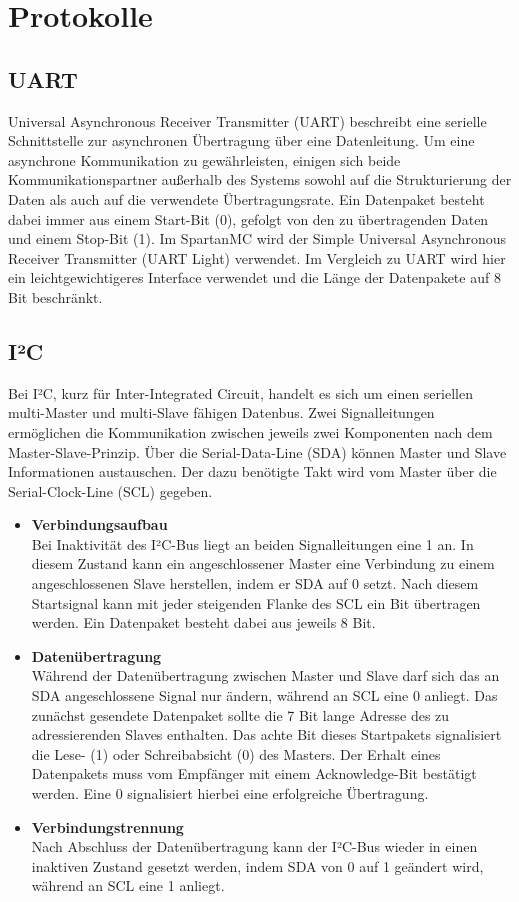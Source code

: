 \documentclass[parskip,
							 oneside,
							 11pt,
							 noheadingspace,
							 accentcolor=tud1d,
							 bigchapter,
							 colorback]{tudreport}
\begin{document}
\chapter{Protokolle}
\section{UART}
Universal Asynchronous Receiver Transmitter (UART) beschreibt eine serielle Schnittstelle zur asynchronen Übertragung über eine Datenleitung. Um eine asynchrone Kommunikation zu gewährleisten, einigen sich beide Kommunikationspartner außerhalb des Systems sowohl auf die Strukturierung der Daten als auch auf die verwendete Übertragungsrate. Ein Datenpaket besteht dabei immer aus einem Start-Bit (0), gefolgt von den zu übertragenden Daten und einem Stop-Bit (1). Im SpartanMC wird der Simple Universal Asynchronous Receiver Transmitter (UART Light) verwendet. Im Vergleich zu UART wird hier ein leichtgewichtigeres Interface verwendet und die Länge der Datenpakete auf 8 Bit beschränkt.
\section{I²C}
Bei I²C, kurz für Inter-Integrated Circuit, handelt es sich um einen seriellen multi-Master und multi-Slave fähigen Datenbus. Zwei Signalleitungen ermöglichen die Kommunikation zwischen jeweils zwei Komponenten nach dem Master-Slave-Prinzip. Über die Serial-Data-Line (SDA) können Master und Slave Informationen austauschen. Der dazu benötigte Takt wird vom Master über die Serial-Clock-Line (SCL) gegeben.

\begin{itemize}
 \item{\textbf{Verbindungsaufbau}} \\
 Bei Inaktivität des I²C-Bus liegt an beiden Signalleitungen eine 1 an. In diesem Zustand kann ein angeschlossener Master eine Verbindung zu einem angeschlossenen Slave herstellen, indem er SDA auf 0 setzt. Nach diesem Startsignal kann mit jeder steigenden Flanke des SCL ein Bit übertragen werden. Ein Datenpaket besteht dabei aus jeweils 8 Bit.

 \item{\textbf{Datenübertragung}} \\
Während der Datenübertragung zwischen Master und Slave darf sich das an SDA angeschlossene Signal nur ändern, während an SCL eine 0 anliegt. Das zunächst gesendete Datenpaket sollte die 7 Bit lange Adresse des zu adressierenden Slaves enthalten. Das achte Bit dieses Startpakets signalisiert die Lese- (1) oder Schreibabsicht (0) des Masters. Der Erhalt eines Datenpakets muss vom Empfänger mit einem Acknowledge-Bit bestätigt werden. Eine 0 signalisiert hierbei eine erfolgreiche Übertragung.

 \item{\textbf{Verbindungstrennung}} \\
Nach Abschluss der Datenübertragung kann der I²C-Bus wieder in einen inaktiven Zustand gesetzt werden, indem SDA von 0 auf 1 geändert wird, während an SCL eine 1 anliegt.
\end{itemize}
\end{document}

